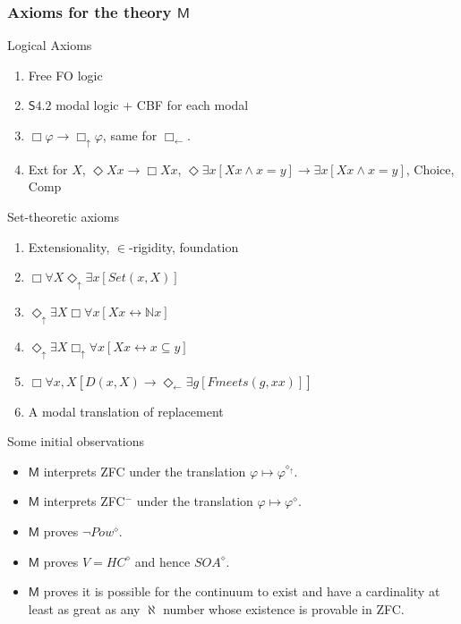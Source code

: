 \documentclass{beamer}
\newcommand{\du}{\Diamond_\uparrow}
\newcommand{\dl}{\Diamond_\leftarrow}
\newcommand{\bu}{\Box_\uparrow}
\newcommand{\bl}{\Box_\leftarrow}
\begin{document}
\begin{frame}
    \frametitle{Axioms for the theory $\mathsf{M}$}
    \begin{block}{Logical Axioms}
    \begin{enumerate}
        \item<2-> Free FO logic
        \item<3-> $\mathsf{S4.2}$ modal logic + CBF for each modal
        \item<4-> $\Box \varphi \rightarrow \bu \varphi$, same for $\bl$.
        \item<5-> Ext for $X$, $\Diamond Xx \rightarrow \Box Xx$, 
        $\Diamond \exists x[Xx \wedge x = y] \rightarrow \exists x[Xx \wedge x = y]$,
        Choice, Comp
    \end{enumerate}
    \end{block}
    \begin{block}{Set-theoretic axioms}
        \begin{enumerate}
        \item<7-> Extensionality, $\in$-rigidity, foundation
        \item<8-> $\Box \forall X \du \exists x [Set(x, X)]$
        \item<9-> $\du \exists X \Box \forall x[Xx \leftrightarrow \mathbb{N}x]$
        \item<10-> $\du \exists X \bu \forall x[Xx \leftrightarrow x \subseteq y]$
        \item<11-> $\Box \forall x, X [D(x, X)\rightarrow \dl \exists g[Fmeets(g, xx)]]$
        \item<12-> A modal translation of replacement
        \end{enumerate}
    \end{block}
\end{frame}
\begin{frame}{Some initial observations}
    \begin{itemize}
        \item<2-> $\mathsf{M}$ interprets ZFC under the translation 
                    $\varphi \mapsto \varphi^{\diamond_\uparrow}$. 
        \item<3-> $\mathsf{M}$ interprets ZFC$^-$ under the translation 
                    $\varphi \mapsto \varphi^\diamond$.
        \item<4-> $\mathsf{M}$ proves $\neg Pow^\diamond$.
        \item<5-> $\mathsf{M}$ proves $V = HC^\diamond$ and hence $SOA^\diamond$.
        \item<5-> $\mathsf{M}$ proves it is possible for the continuum 
                    to exist and have a cardinality at least as great as 
                    any $\aleph$ number whose existence is provable 
                    in ZFC.
    \end{itemize}
\end{frame}
\end{document}
